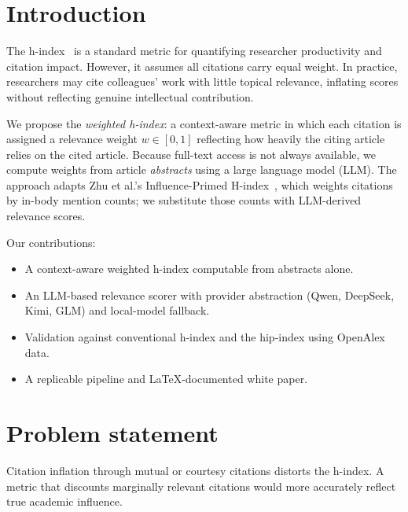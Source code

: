 \section{Introduction}

The h-index~\cite{hirsch2005} is a standard metric for quantifying researcher productivity and citation impact. However, it assumes all citations carry equal weight. In practice, researchers may cite colleagues' work with little topical relevance, inflating scores without reflecting genuine intellectual contribution.

We propose the \emph{weighted h-index}: a context-aware metric in which each citation is assigned a relevance weight $w \in [0,1]$ reflecting how heavily the citing article relies on the cited article. Because full-text access is not always available, we compute weights from article \emph{abstracts} using a large language model (LLM). The approach adapts Zhu et al.'s Influence-Primed H-index~\cite{zhu2015measuring}, which weights citations by in-body mention counts; we substitute those counts with LLM-derived relevance scores.

Our contributions:
\begin{itemize}
    \item A context-aware weighted h-index computable from abstracts alone.
    \item An LLM-based relevance scorer with provider abstraction (Qwen, DeepSeek, Kimi, GLM) and local-model fallback.
    \item Validation against conventional h-index and the hip-index using OpenAlex data.
    \item A replicable pipeline and LaTeX-documented white paper.
\end{itemize}

\section*{Problem statement}

Citation inflation through mutual or courtesy citations distorts the h-index. A metric that discounts marginally relevant citations would more accurately reflect true academic influence.
